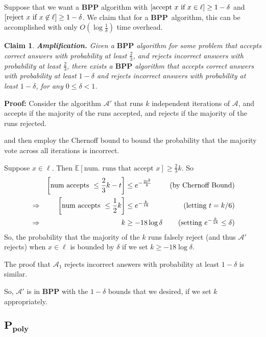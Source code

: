 \documentclass[11pt]{article}
\let\Pr\relax
\DeclareMathOperator*{\Pr}{\mathbb{P}}
\newcommand{\BPP}{\ensuremath{\mathbf{BPP}}}
\newcommand{\Ppoly}{\ensuremath{\mathbf{P_{poly}}}}
\newcommand{\Alg}{\ensuremath{\mathcal{A}}}
\newtheorem{claim}[theorem]{Claim}
\begin{document}
Suppose that we want a $\BPP$ algorithm with $\Pr[\text{accept $x$ if $x\in\ell$}] \ge 1-\delta$ and $\Pr[\text{reject $x$ if $x\not\in\ell$}] \ge 1 - \delta$. We claim that for a \BPP\ algorithm, this can be accomplished with only $O(\log{\frac{1}{\delta}})$ time overhead.

\begin{claim}\label{amplification}
\textbf{Amplification.} Given a $\BPP$ algorithm for some problem that accepts correct answers with probability at least $\frac23$, and rejects incorrect answers with probability at least $\frac23$, there exists a $\BPP$ algorithm that accepts correct answers with probability at least $1 - \delta$ and rejects incorrect answers with probability at least $1 - \delta$, for any $0 \le \delta < 1$.

\end{claim}

\begin{leftbar}


\textbf{Proof:} Consider the algorithm $\Alg'$ that runs $k$ independent iterations of $\Alg$, and accepts if the majority of the runs accepted, and rejects if the majority of the runs rejected.

and then employ the Chernoff bound to bound the probability that the majority vote across all iterations is incorrect.

Suppose $x\in\ell$. Then $\mathbb{E}[\text{num. runs that accept } x] \geq \frac{2}{3}k$.
So
\begin{align*}
  &&\Pr\left[\text{num accepts }\leq \frac{2}{3}k - t\right] &\leq e^{-{\frac{2t^2}{k}}} &\text{(by Chernoff Bound)} \\
  &\Rightarrow&
  \Pr\left[\text{num accepts }\leq \frac12k\right] &\leq e^{-{\frac{k}{18}}} &\text{(letting $t = k/6$)} \\
  &\Rightarrow &
  k &\ge -18\log \delta &\text{(setting $e^{-\frac{k}{18}} \le \delta$)}
\end{align*}
So, the probability that the majority of the $k$ runs falsely reject (and thus $\Alg'$ rejects) when $x \in \ell$ is bounded by $\delta$ if we set $k \ge -18 \log \delta$.

The proof that $\Alg_1$ rejects incorrect answers with probability at least $1 - \delta$ is similar.

So, $\Alg'$ is in $\BPP$ with the $1 - \delta$ bounds that we desired, if we set $k$ appropriately.
\end{leftbar}

\subsection{\Ppoly}
\end{document}
